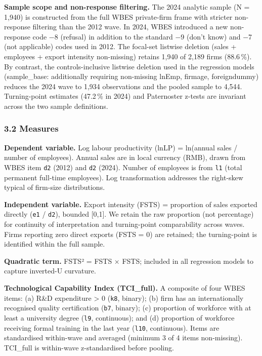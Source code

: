 \documentclass[12pt,a4paper]{article}
\begin{document}
\textbf{Sample scope and non-response filtering.} The 2024 analytic
sample (N = 1,940) is constructed from the full WBES private-firm frame
with stricter non-response filtering than the 2012 wave. In 2024, WBES
introduced a new non-response code −8 (refusal) in addition to the
standard −9 (don't know) and −7 (not applicable) codes used in 2012. The
focal-set listwise deletion (sales + employees + export intensity
non-missing) retains 1,940 of 2,189 firms (88.6\,\%). By contrast, the
controls-inclusive listwise deletion used in the regression models
(sample\_base: additionally requiring non-missing lnEmp, firmage,
foreigndummy) reduces the 2024 wave to 1,934 observations and the pooled
sample to 4,544. Turning-point estimates (47.2\,\% in 2024) and
Paternoster z-tests are invariant across the two sample definitions.

\hypertarget{32-measures}{%
\subsubsection{3.2 Measures}\label{32-measures}}

\textbf{Dependent variable.} Log labour productivity (lnLP) = ln(annual
sales / number of employees). Annual sales are in local currency (RMB),
drawn from WBES item \texttt{d2} (2012) and \texttt{d2} (2024). Number
of employees is from \texttt{l1} (total permanent full-time employees).
Log transformation addresses the right-skew typical of firm-size
distributions.

\textbf{Independent variable.} Export intensity (FSTS) = proportion of
sales exported directly (\texttt{e1} / \texttt{d2}), bounded {[}0,1{]}.
We retain the raw proportion (not percentage) for continuity of
interpretation and turning-point comparability across waves. Firms
reporting zero direct exports (FSTS = 0) are retained; the turning-point
is identified within the full sample.

\textbf{Quadratic term.} FSTS² = FSTS × FSTS; included in all regression
models to capture inverted-U curvature.

\textbf{Technological Capability Index (TCI\_full).} A composite of four
WBES items: (a) R\&D expenditure \textgreater{} 0 (\texttt{k8}, binary);
(b) firm has an internationally recognised quality certification
(\texttt{b7}, binary); (c) proportion of workforce with at least a
university degree (\texttt{l9}, continuous); and (d) proportion of
workforce receiving formal training in the last year (\texttt{l10},
continuous). Items are standardised within-wave and averaged (minimum 3
of 4 items non-missing). TCI\_full is within-wave z-standardised before
pooling.
\end{document}
